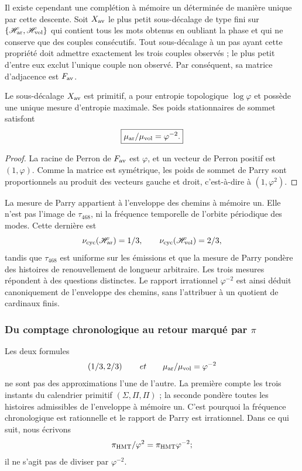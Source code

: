 Il existe cependant une complétion à mémoire un déterminée de manière
unique par cette descente. Soit \(X_{\rm av}\) le plus petit sous-décalage de type fini
sur
\(\{\mathscr H_{\rm ar},\mathscr H_{\rm vol}\}\) qui contient tous les
mots obtenus en oubliant la phase et qui ne conserve que des couples consécutifs.
Tout sous-décalage à un pas ayant cette propriété doit admettre exactement les trois
couples observés ; le plus petit d'entre eux exclut l'unique couple non observé. Par
conséquent, sa matrice d'adjacence est \(F_{\rm av}\).

\begin{corollary}
\label{cor:parry-envolvente-fav}
Le sous-décalage \(X_{\rm av}\) est primitif, a pour entropie topologique
\(\log\varphi\) et possède une unique mesure d'entropie maximale. Ses poids
stationnaires de sommet satisfont
\[
 \boxed{
 \frac{\mu_{\rm ar}}{\mu_{\rm vol}}=\varphi^{-2}.}
\]
\end{corollary}

\begin{proof}
La racine de Perron de \(F_{\rm av}\) est \(\varphi\), et un vecteur de Perron
positif est \((1,\varphi)\). Comme la matrice est symétrique, les poids de sommet
de Parry sont proportionnels au produit des vecteurs gauche et droit,
c'est-à-dire à \((1,\varphi^2)\).
\end{proof}

La mesure de Parry appartient à l'enveloppe des chemins à mémoire un. Elle n'est pas
l'image de \(\tau_{468}\), ni la fréquence temporelle de l'orbite périodique
des modes. Cette dernière est
\[
 \nu_{\rm cyc}(\mathscr H_{\rm ar})=\frac13,\qquad
 \nu_{\rm cyc}(\mathscr H_{\rm vol})=\frac23,
\]
tandis que \(\tau_{468}\) est uniforme sur les émissions et que la mesure de Parry
pondère des histoires de renouvellement de longueur arbitraire. Les trois mesures
répondent à des questions distinctes. Le rapport irrationnel
\(\varphi^{-2}\) est ainsi déduit canoniquement de l'enveloppe des chemins,
sans l'attribuer à un quotient de cardinaux finis.

\subsubsection{Du comptage chronologique au retour marqué par \texorpdfstring{\(\pi\)}{π}}
\label{sec:retorno-marcado-pi-phi2}

Les deux formules
\[
 \left(\frac13,\frac23\right)
 \qquad\text{et}\qquad
 \frac{\mu_{\rm ar}}{\mu_{\rm vol}}=\varphi^{-2}
\]
ne sont pas des approximations l'une de l'autre. La première compte les trois instants du
calendrier primitif \((\Sigma,\Pi,\Pi)\) ; la seconde pondère toutes les
histoires admissibles de l'enveloppe à mémoire un. C'est pourquoi la fréquence
chronologique est rationnelle et le rapport de Parry est irrationnel. Dans ce qui suit,
nous écrivons
\[
 \frac{\pi_{\rm HMT}}{\varphi^2}
 =\pi_{\rm HMT}\varphi^{-2};
\]
il ne s'agit pas de diviser par \(\varphi^{-2}\).

